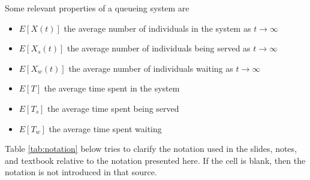\documentclass{article}
\begin{document}

Some relevant properties of a queueing system are 
\begin{itemize}
\item $E[X(t)]$ the average number of individuals in the system as $t\to\infty$
\item $E[X_s(t)]$ the average number of individuals being served as $t\to\infty$
\item $E[X_w(t)]$ the average number of individuals waiting as $t\to\infty$
\item $E[T]$ the average time spent in the system
\item $E[T_s]$ the average time spent being served
\item $E[T_w]$ the average time spent waiting
\end{itemize}

Table \ref{tab:notation} below tries to clarify the notation used in the slides, notes, and textbook relative to the notation presented here. If the cell is blank, then the notation is not introduced in that source. 
\end{document}
